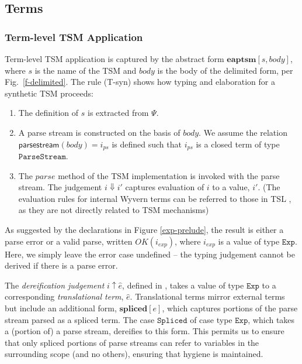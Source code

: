 




\subsection{Terms}
\subsubsection{Term-level TSM Application}
Term-level TSM application is captured by the abstract form $\textbf{eaptsm}[s, body]$, where $s$ is the name of the TSM and $body$ is the body of the delimited form, per Fig.~\ref{f-delimited}. The rule (T-syn) shows how typing and elaboration for a synthetic TSM proceeds:
\begin{enumerate}\itemsep0pt
\item The definition of $s$ is extracted from $\Psi$. 
\item A parse stream is constructed on the basis of $body$. We assume the relation $\mathsf{parsestream}(body)=i_{ps}$ is defined such that $i_{ps}$ is a closed term of type $\mathtt{ParseStream}$. 
\item The $parse$ method of the TSM implementation is invoked with the parse stream. The judgement $i \Downarrow i'$ captures evaluation of $i$ to a value, $i'$. (The evaluation rules for internal Wyvern terms can be referred to those in TSL \cite{TSLs}, as they are not directly related to TSM mechanisms)
\end{enumerate}
As suggested by the declarations in Figure \ref{exp-prelude}, the result is either a parse error or a valid parse, written $OK(i_{exp})$, where $i_{exp}$ is a value of type $\mathtt{Exp}$. Here, we simply leave the error case undefined -- the typing judgement cannot be derived if there is a parse error.%

The \emph{dereification judgement} $i \uparrow \hat{e}$, defined in \cite{TSLs}, takes a value of type $\mathtt{Exp}$ to a corresponding \emph{translational term}, $\hat{e}$. 
Translational terms mirror external terms but include an additional form, $\textbf{spliced}[e]$, which captures portions of the parse stream parsed as a spliced term. The case $\mathtt{Spliced}$ of case type $\mathtt{Exp}$, which takes a (portion of) a parse stream, dereifies to this form. This permits us to ensure that only spliced portions of parse streams can refer to variables in the surrounding scope (and no others), ensuring that hygiene is maintained. 

